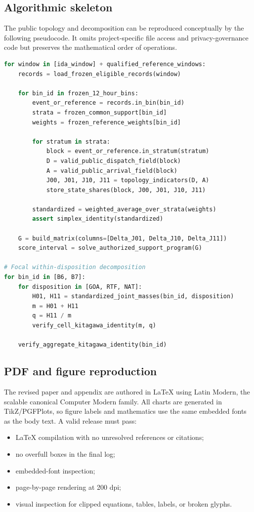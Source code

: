 \documentclass[11pt]{article}
\begin{document}
\subsection{Algorithmic skeleton}

The public topology and decomposition can be reproduced conceptually by the following pseudocode. It omits project-specific file access and privacy-governance code but preserves the mathematical order of operations.

\begin{lstlisting}[language=Python]
for window in [ida_window] + qualified_reference_windows:
    records = load_frozen_eligible_records(window)

    for bin_id in frozen_12_hour_bins:
        event_or_reference = records.in_bin(bin_id)
        strata = frozen_common_support[bin_id]
        weights = frozen_reference_weights[bin_id]

        for stratum in strata:
            block = event_or_reference.in_stratum(stratum)
            D = valid_public_dispatch_field(block)
            A = valid_public_arrival_field(block)
            J00, J01, J10, J11 = topology_indicators(D, A)
            store_state_shares(block, J00, J01, J10, J11)

        standardized = weighted_average_over_strata(weights)
        assert simplex_identity(standardized)

    G = build_matrix(columns=[Delta_J01, Delta_J10, Delta_J11])
    score_interval = solve_authorized_support_program(G)

# Focal within-disposition decomposition
for bin_id in [B6, B7]:
    for disposition in [GOA, RTF, NAT]:
        H01, H11 = standardized_joint_masses(bin_id, disposition)
        m = H01 + H11
        q = H11 / m
        verify_cell_kitagawa_identity(m, q)

    verify_aggregate_kitagawa_identity(bin_id)
\end{lstlisting}

\subsection{PDF and figure reproduction}

The revised paper and appendix are authored in LaTeX using Latin Modern, the scalable canonical Computer Modern family. All charts are generated in TikZ/PGFPlots, so figure labels and mathematics use the same embedded fonts as the body text. A valid release must pass:
\begin{itemize}
\item LaTeX compilation with no unresolved references or citations;
\item no overfull boxes in the final log;
\item embedded-font inspection;
\item page-by-page rendering at 200 dpi;
\item visual inspection for clipped equations, tables, labels, or broken glyphs.
\end{itemize}
\end{document}
